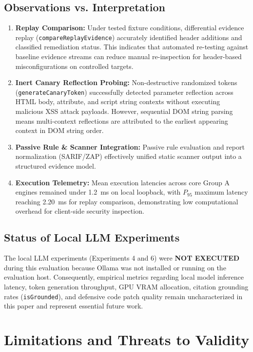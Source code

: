 \documentclass[conference]{IEEEtran}
\begin{document}
\subsection{Observations vs. Interpretation}
\begin{enumerate}
    \item \textbf{Replay Comparison:} Under tested fixture conditions, differential evidence replay (\texttt{compareReplayEvidence}) accurately identified header additions and classified remediation status. This indicates that automated re-testing against baseline evidence streams can reduce manual re-inspection for header-based misconfigurations on controlled targets.
    \item \textbf{Inert Canary Reflection Probing:} Non-destructive randomized tokens (\texttt{generateCanaryToken}) successfully detected parameter reflection across HTML body, attribute, and script string contexts without executing malicious XSS attack payloads. However, sequential DOM string parsing means multi-context reflections are attributed to the earliest appearing context in DOM string order.
    \item \textbf{Passive Rule \& Scanner Integration:} Passive rule evaluation and report normalization (SARIF/ZAP) effectively unified static scanner output into a structured evidence model.
    \item \textbf{Execution Telemetry:} Mean execution latencies across core Group A engines remained under 1.2~ms on local loopback, with $P_{95}$ maximum latency reaching 2.20~ms for replay comparison, demonstrating low computational overhead for client-side security inspection.
\end{enumerate}

\subsection{Status of Local LLM Experiments}
The local LLM experiments (Experiments 4 and 6) were \textbf{NOT EXECUTED} during this evaluation because Ollama was not installed or running on the evaluation host. Consequently, empirical metrics regarding local model inference latency, token generation throughput, GPU VRAM allocation, citation grounding rates (\texttt{isGrounded}), and defensive code patch quality remain uncharacterized in this paper and represent essential future work.

\section{Limitations and Threats to Validity}
\end{document}
